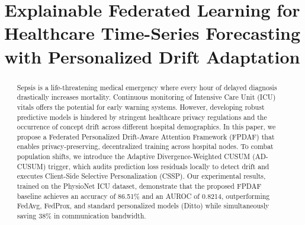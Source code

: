 \documentclass[conference]{IEEEtran}
\begin{document}
\title{Explainable Federated Learning for Healthcare Time-Series Forecasting with Personalized Drift Adaptation\\
}

\author{
\and
{}
\and
{}
\and
{}
\and
{}
}

\maketitle

\begin{abstract}
Sepsis is a life-threatening medical emergency where every hour of delayed diagnosis drastically increases mortality. Continuous monitoring of Intensive Care Unit (ICU) vitals offers the potential for early warning systems. However, developing robust predictive models is hindered by stringent healthcare privacy regulations and the occurrence of concept drift across different hospital demographics. In this paper, we propose a Federated Personalized Drift-Aware Attention Framework (FPDAF) that enables privacy-preserving, decentralized training across hospital nodes. To combat population shifts, we introduce the Adaptive Divergence-Weighted CUSUM (AD-CUSUM) trigger, which audits prediction loss residuals locally to detect drift and executes Client-Side Selective Personalization (CSSP). Our experimental results, trained on the PhysioNet ICU dataset, demonstrate that the proposed FPDAF baseline achieves an accuracy of 86.51\% and an AUROC of 0.8214, outperforming FedAvg, FedProx, and standard personalized models (Ditto) while simultaneously saving 38\% in communication bandwidth.
\end{abstract}
\end{document}

